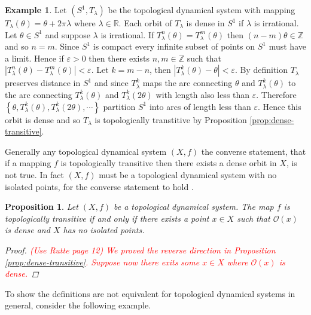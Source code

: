 \documentclass[11pt,a4paper,oneside]{memoir}
\theoremstyle{plain}
\newtheorem{prop}[thm]{Proposition}
\theoremstyle{definition}
\newtheorem{exmp}[thm]{Example}
\begin{document}
\begin{exmp} \label{exmp:s1irrational}
    Let $(S^1, T_{\lambda})$ be the topological dynamical system with mapping $T_\lambda(\theta) = \theta + 2\pi \lambda$ where $\lambda \in \mathbb{R}$. Each orbit of $T_\lambda$ is dense in $S^1$ if $\lambda$ is irrational. Let $\theta \in S^1$ and suppose $\lambda$ is irrational. If $T_\lambda^n(\theta) = T_\lambda^m(\theta)$ then $(n - m)\theta \in \mathbb{Z}$ and so $n = m$. Since $S^1$ is compact every infinite subset of points on $S^1$ must have a limit. Hence if $\varepsilon > 0$ then there exists $n, m \in \mathbb{Z}$ such that $\left\lvert T_\lambda^n(\theta) - T_\lambda^m(\theta) \right\rvert < \varepsilon$. Let $k = m - n$, then $\left\lvert T_\lambda^k(\theta) - \theta \right\rvert < \varepsilon$. By definition $T_\lambda$ preserves distance in $S^1$ and since $T_\lambda^k$ maps the arc connecting $\theta$ and $T_\lambda^k(\theta)$ to the arc connecting $T_\lambda^k(\theta)$ and $T_\lambda^k(2 \theta)$ with length also less than $\varepsilon$. Therefore $\left\lbrace \theta, T_\lambda^k(\theta), T_\lambda^k(2 \theta), \cdots \right\rbrace$ partition $S^1$ into arcs of length less than $\varepsilon$. Hence this orbit is dense and so $T_\lambda$ is topologically transtitive by Proposition \ref{prop:dense-transitive}.
\end{exmp}

Generally any topological dynamical system $(X, f)$ the converse statement, that if a mapping $f$ is topologically transitive then there exists a dense orbit in $X$, is not true. In fact $(X, f)$ must be a topological dynamical system with no isolated points, for the converse statement to hold \cite[Section 2]{sergiy-lubomir}.

\begin{prop}
    Let $(X, f)$ be a topological dynamical system. The map $f$ is topologically transitive if and only if there exists a point $x \in X$ such that $\mathcal{O}(x)$ is dense and $X$ has no isolated points.
    \begin{proof}
        \textcolor{red}{(Use Rutte page 12) We proved the reverse direction in Proposition \ref{prop:dense-transitive}. Suppose now there exits some $x \in X$ where $\mathcal{O}(x)$ is dense.}
    \end{proof}
\end{prop}

To show the definitions are not equivalent for topological dynamical systems in general, consider the following example.
\end{document}
